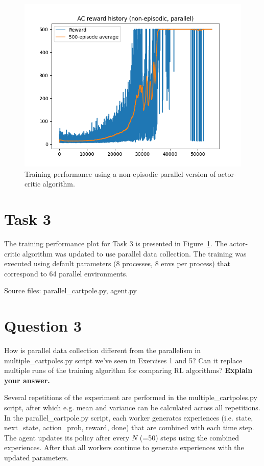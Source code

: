 \documentclass[12pt]{article}
\begin{document}
\begin{figure}[phb] 
	\centering  %
    \includegraphics[width=0.8\columnwidth]{img/Figure_3_task_3_cumulative_reward_ContinuousCartPole-v0.png}
	\caption{Training performance using a non-episodic parallel version of actor-critic algorithm.}
	\label{fig:fig3}
\end{figure}


\section*{Task 3}

The training performance plot for Task 3 is presented in Figure~\ref*{fig:fig3}. The actor-critic algorithm was updated to use parallel data collection.
The training was executed using default parameters (8 processes, 8 envs per process) that correspond to 64 parallel environments. 
\newline

\noindent
Source files: parallel\_cartpole.py, agent.py

\pagebreak


\section*{Question 3}

How is parallel data collection different from the parallelism in
multiple\_cartpoles.py script we’ve seen in Exercises 1 and 5? Can it replace multiple runs of
the training algorithm for comparing RL algorithms? \textbf{Explain your answer.}
\newline

Several repetitions of the experiment are performed in the multiple\_cartpoles.py script, after which e.g. mean and variance can be calculated across all repetitions. 
In the parallel\_cartpole.py script, each worker generates experiences (i.e. state, next\_state, action\_prob, reward, done) that are combined with each time step. The agent updates its policy after every $N$ (=50) steps using the combined experiences. After that all workers continue to generate experiences with the updated parameters.
\newline
\end{document}
